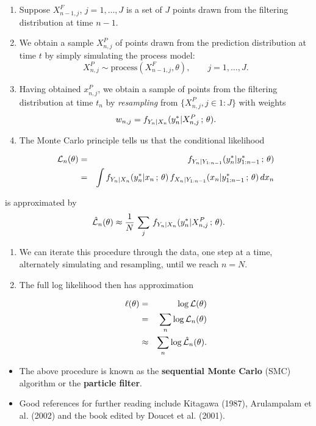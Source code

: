 \documentclass[]{article}
\begin{document}
\begin{enumerate}
\def\labelenumi{\arabic{enumi}.}
\item
  Suppose \(X_{n-1,j}^{F}\), \(j=1,\dots,J\) is a set of \(J\) points
  drawn from the filtering distribution at time \(n-1\).
\item
  We obtain a sample \(X_{n,j}^{P}\) of points drawn from the prediction
  distribution at time \(t\) by simply simulating the process model:
  \[X_{n,j}^{P} \sim \mathrm{process}(X_{n-1,j}^{F},\theta), \qquad j=1,\dots,J.\]
\item
  Having obtained \(x_{n,j}^{P}\), we obtain a sample of points from the
  filtering distribution at time \(t_n\) by \emph{resampling} from
  \(\big\{X_{n,j}^{P},j\in 1:J\big\}\) with weights
  \[w_{n,j}=f_{Y_n|X_n}(y^*_{n}|X^P_{n,j}\, ; \,\theta).\]
\item
  The Monte Carlo principle tells us that the conditional likelihood

  \begin{eqnarray}
  \mathcal{L}_n(\theta) &=& f_{Y_n|Y_{1:n-1}}(y^*_n|y^*_{1:n-1}\, ; \,\theta)
  \\
  &=& 
  \int
  f_{Y_n|X_n}(y^*_{n}|x_{n}\, ; \,\theta)\,f_{X_n|Y_{1:n-1}}(x_{n}|y^*_{1:n-1}\, ; \,\theta)\, dx_n
  \end{eqnarray}
\end{enumerate}

is approximated by
\[\hat{\mathcal{L}}_n(\theta)  \approx \frac{1}{N}\,\sum_j\, f_{Y_n|X_n}(y^*_{n}|X_{n,j}^{P}\, ; \,\theta).\]

\begin{enumerate}
\def\labelenumi{\arabic{enumi}.}
\setcounter{enumi}{4}
\item
  We can iterate this procedure through the data, one step at a time,
  alternately simulating and resampling, until we reach \(n=N\).
\item
  The full log likelihood then has approximation

  \begin{eqnarray}\ell(\theta) 
  &=& \log{\mathcal{L}(\theta)} 
  \\
  &=& \sum_n \log{\mathcal{L}_n(\theta)}
  \\
  &\approx& \sum_n\log\hat{\mathcal{L}}_n(\theta).
  \end{eqnarray}
\end{enumerate}

\begin{itemize}
\item
  The above procedure is known as the \textbf{sequential Monte Carlo}
  (SMC) algorithm or the \textbf{particle filter}.
\item
  Good references for further reading include Kitagawa (1987),
  Arulampalam et al. (2002) and the book edited by Doucet et al. (2001).
\end{itemize}
\end{document}
